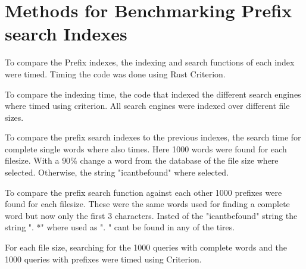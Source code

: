 \section{Methods for Benchmarking Prefix search Indexes}
To compare the Prefix indexes, the indexing and search functions of each index were timed. Timing the code was done using Rust Criterion. 

To compare the indexing time, the code that indexed the different search engines where timed using criterion. All search engines were indexed over different file sizes.

To compare the prefix search indexes to the previous indexes, the search time for complete single words where also times. Here 1000 words were found for each filesize. With a $90\%$ change a word from the database of the file size where selected. Otherwise, the string "icantbefound" where selected.

To compare the prefix search function against each other 1000 prefixes were found for each filesize. These were the same words used for finding a complete word but now only the first 3 characters. Insted of the "icantbefound" string the string ". *" where used as ". " cant be found in any of the tires.

For each file size, searching for the 1000 queries with complete words and the 1000 queries with prefixes were timed using Criterion.


